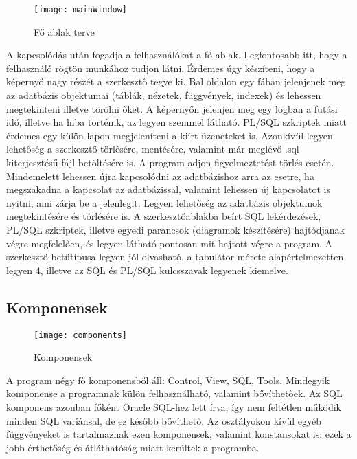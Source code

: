 \begin{figure}[ht]
  \begin{center}
  \texttt{[image: mainWindow]}
  \end{center}
 \caption{Fő ablak terve}
\end{figure}

A kapcsolódás után fogadja a felhasználókat a fő ablak. Legfontosabb itt, hogy a felhasználó rögtön munkához tudjon látni.
Érdemes úgy készíteni, hogy a képernyő nagy részét a szerkesztő tegye ki. Bal oldalon egy fában jelenjenek meg az adatbázis objektumai
(táblák, nézetek, függvények, indexek) és lehessen megtekinteni illetve törölni őket. A képernyőn jelenjen meg egy logban a futási idő,
illetve ha hiba történik, az legyen szemmel látható. PL/SQL szkriptek miatt érdemes egy külön lapon megjeleníteni a kiírt üzeneteket is.
Azonkívül legyen lehetőség a szerkesztő törlésére, mentésére, valamint már meglévő .sql kiterjesztésű fájl betöltésére is. A program adjon figyelmeztetést
törlés esetén. Mindemelett lehessen újra kapcsolódni az adatbázishoz arra az esetre, ha megszakadna a kapcsolat az adatbázissal, valamint
lehessen új kapcsolatot is nyitni, ami zárja be a jelenlegit. Legyen lehetőség az adatbázis objektumok megtekintésére és törlésére is.
A szerkesztőablakba beírt SQL lekérdezések, PL/SQL szkriptek, illetve egyedi parancsok (diagramok készítésére) hajtódjanak végre megfelelően,
és legyen látható pontosan mit hajtott végre a program. A szerkesztő betűtípusa legyen jól olvasható, a tabulátor mérete alapértelmezetten legyen
4, illetve az SQL és PL/SQL kulcsszavak legyenek kiemelve.

\subsection{Komponensek}

\begin{figure}[ht]
  \begin{center}
  \texttt{[image: components]}
  \end{center}
 \caption{Komponensek}
\end{figure}

A program négy fő komponensből áll: Control, View, SQL, Tools. Mindegyik komponense a programnak külön felhasználható,
valamint bővíthetőek. Az SQL komponens azonban főként Oracle SQL-hez lett írva, így nem feltétlen működik minden
SQL variánsal, de ez később bővíthető. Az osztályokon kívűl egyéb függvényeket is tartalmaznak ezen komponensek, valamint
konstansokat is: ezek a jobb érthetőség és átláthatóság miatt kerültek a programba.

